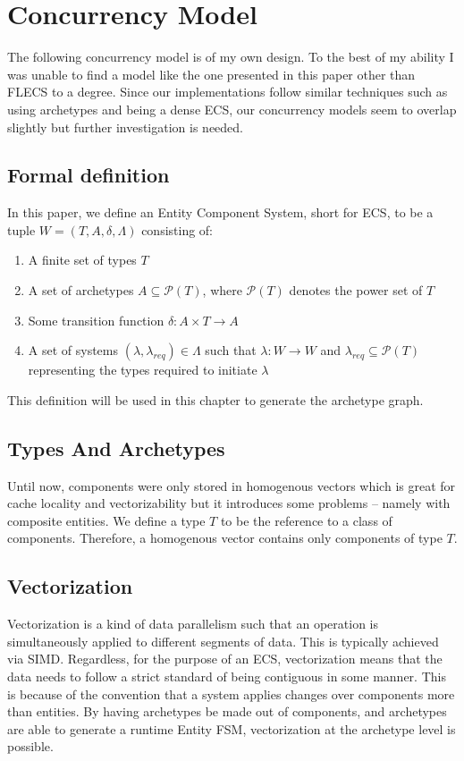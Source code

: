 
\section{Concurrency Model}
\label{chap:2}
The following concurrency model is of my own design. To the best of my ability I was unable to find a model like the one presented in this paper other than FLECS to a degree. Since our implementations follow similar techniques such as using archetypes and being a dense ECS, our concurrency models seem to overlap slightly but further investigation is needed.

\subsection{Formal definition} \label{section:formal_definition}
In this paper, we define an Entity Component System, short for ECS, to be a tuple $W = (T, A, \delta, \Lambda)$ consisting of:
\begin{enumerate}
    \item A finite set of types $T$
    \item A set of archetypes $A \subseteq \mathcal{P}(T)$, where $\mathcal{P}(T)$ denotes the power set of $T$    
    \item Some transition function $\delta : A \times T \rightarrow A$
    \item A set of systems $(\lambda, \lambda_{req}) \in \Lambda$ such that $\lambda : W \rightarrow W$ and $\lambda_{req} \subseteq \mathcal{P}(T)$ representing the types required to initiate $\lambda$
\end{enumerate}
This definition will be used in this chapter to generate the archetype graph.

\subsection{Types And Archetypes}
Until now, components were only stored in homogenous vectors which is great for cache locality and vectorizability but it introduces some problems -- namely with composite entities. We define a type $T$ to be the reference to a class of components. Therefore, a homogenous vector contains only components of type $T$.

\subsection{Vectorization}
Vectorization is a kind of data parallelism such that an operation is simultaneously applied to different segments of data. This is typically achieved via SIMD. Regardless, for the purpose of an ECS, vectorization means that the data needs to follow a strict standard of being contiguous in some manner. This is because of the convention that a system applies changes over components more than entities. By having archetypes be made out of components, and archetypes are able to generate a runtime Entity FSM, vectorization at the archetype level is possible. 


